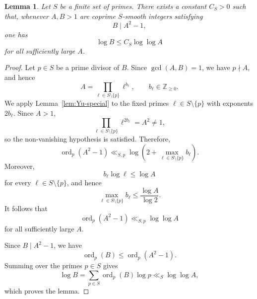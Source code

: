 \documentclass[10pt,a4paper]{amsart}
\newtheorem{lemma}{Lemma}
\newcommand{\Z}{\mathbb Z}
\DeclareMathOperator{\ord}{ord}
\begin{document}
\begin{lemma}\label{lem:smooth-congruence}
Let $S$ be a finite set of primes. There exists a constant $C_S>0$
such that, whenever $A,B>1$ are coprime $S$-smooth integers satisfying
\begin{equation}\label{eq:divides-abstract}
 B\mid A^2-1,
\end{equation}
one has
\begin{equation}\label{eq:smooth-congruence}
 \log B\le C_S\log\log A
\end{equation}
for all sufficiently large $A$.
\end{lemma}

\begin{proof}
Let $p\in S$ be a prime divisor of $B$. Since $\gcd(A,B)=1$, we have
$p\nmid A$, and hence
\[
 A=\prod_{\ell\in S\setminus\{p\}}\ell^{b_\ell},
 \qquad b_\ell\in\Z_{\ge0}.
\]
We apply Lemma~\ref{lem:Yu-special} to the fixed primes
$\ell\in S\setminus\{p\}$ with exponents $2b_\ell$. Since $A>1$,
\[
 \prod_{\ell\in S\setminus\{p\}}\ell^{2b_\ell}
 =A^2\ne1,
\]
so the non-vanishing hypothesis is satisfied. Therefore,
\begin{equation}\label{eq:Yu-use}
 \ord_p(A^2-1)
 \ll_{S,p}
 \log\left(
 2+\max_{\ell\in S\setminus\{p\}} b_\ell
 \right).
\end{equation}
Moreover,
\[
 b_\ell\log\ell\le\log A
\]
for every $\ell\in S\setminus\{p\}$, and hence
\[
 \max_{\ell\in S\setminus\{p\}}b_\ell
 \le \frac{\log A}{\log2}.
\]
It follows that
\begin{equation}\label{eq:vp-loglog}
 \ord_p(A^2-1)\ll_{S,p}\log\log A
\end{equation}
for all sufficiently large $A$.

Since $B\mid A^2-1$, we have
\[
 \ord_p(B)\le \ord_p(A^2-1).
\]
Summing over the primes $p\in S$ gives
\[
 \log B
 =\sum_{p\in S}\ord_p(B)\log p
 \ll_S\log\log A,
\]
which proves the lemma.
\end{proof}
\end{document}
